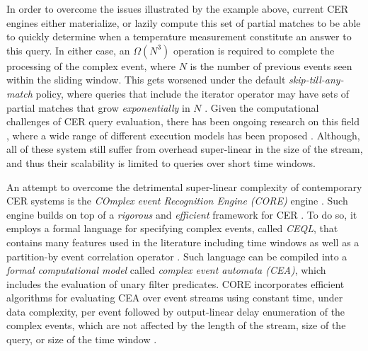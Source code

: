 In order to overcome the issues illustrated by the example above, current CER engines either materialize, or lazily compute this set of partial matches to be able to quickly determine when a temperature measurement constitute an answer to this query. In either case, an $\Omega(N^{3})$ operation is required to complete the processing of the complex event, where $N$ is the number of previous events seen within the sliding window. This gets worsened under the default \emph{skip-till-any-match} \cite{skip-till-any-match} policy, where queries that include the iterator operator may have sets of partial matches that grow \emph{exponentially} in $N$ \cite{core}. 
Given the computational challenges of CER query evaluation, there has been ongoing research on this field \cite{research-evaluation-query, formal-framework-cer}, where a wide range of different execution models has been proposed \cite{survey-systems-1, survey-systems-2}. %
Although, all of these system still suffer from overhead super-linear in the size of the stream, and thus their scalability is limited to queries over short time windows. %

An attempt to overcome the detrimental super-linear complexity of contemporary CER systems is the \emph{COmplex event Recognition Engine (CORE)} engine \cite{core}. Such engine builds on top of a \emph{rigorous} and \emph{efficient} framework for CER \cite{formal-framework-cep, formal-framework-cer}. To do so, it employs a formal language for specifying complex events, called \emph{CEQL}, that contains many features used in the literature including time windows as well as a partition-by event correlation operator \cite{on-the-expressiveness, core}. Such language can be compiled into a \emph{formal computational model} called \emph{complex event automata (CEA)}, which includes the evaluation of unary filter predicates. %
CORE incorporates efficient algorithms for evaluating CEA over event streams using constant time, under data complexity, per event followed by output-linear delay enumeration of the complex events, which are not affected by the length of the stream, size of the query, or size of the time window \cite{formal-framework-cer, core}.%

